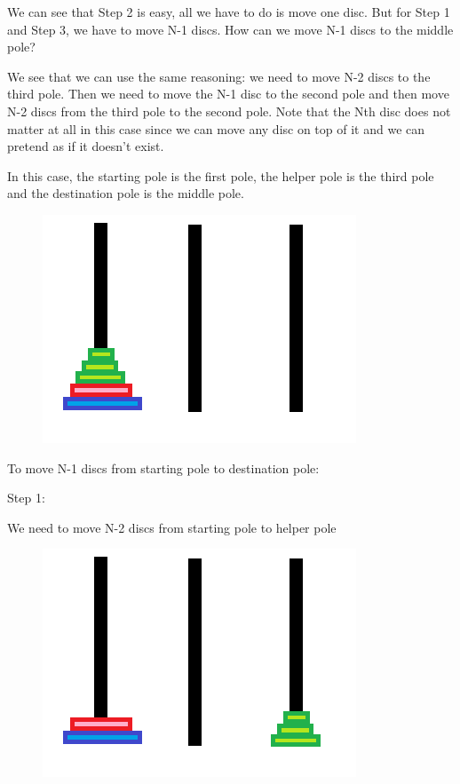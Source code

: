 \documentclass[11pt,oneside]{book}
\makeatletter
\def\maxwidth#1{\ifdim\Gin@nat@width>#1 #1\else\Gin@nat@width\fi}
\makeatother
\begin{document}
We can see that Step 2 is easy, all we have to do is move one disc. But for Step 1 and Step 3, we have to move N-1 discs. How can we move N-1 discs to the middle pole?

We see that we can use the same reasoning: we need to move N-2 discs to the third pole. Then we need to move the N-1 disc to the second pole and then move N-2 discs from the third pole to the second pole. Note that the Nth disc does not matter at all in this case since we can move any disc on top of it and we can pretend as if it doesn't exist.

In this case, the starting pole is the first pole, the helper pole is the third pole and the destination pole is the middle pole.

\vspace{5px}\begin{figure}[H]\centering
        \includegraphics[width=0.66\maxwidth{\textwidth}]{hanoi.png}
        \end{figure}

To move N-1 discs from starting pole to destination pole:

Step 1:

We need to move N-2 discs from starting pole to helper pole

\vspace{5px}\begin{figure}[H]\centering
        \includegraphics[width=0.66\maxwidth{\textwidth}]{hanoi5.png}
        \end{figure}
\end{document}

